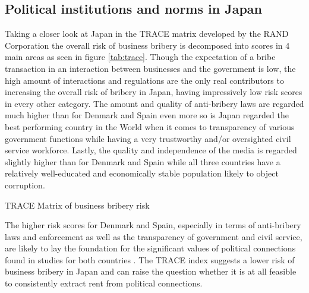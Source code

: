 \subsection{Political institutions and norms in Japan}
Taking a closer look at Japan in the TRACE matrix developed by the RAND Corporation \citep{stanley2014business} the overall risk of business bribery is decomposed into scores in 4 main areas as seen in figure \ref{tab:trace}. Though the expectation of a bribe transaction in an interaction between businesses and the government is low, the high amount of interactions and regulations are the only real contributors to increasing the overall risk of bribery in Japan, having impressively low risk scores in every other category. The amount and quality of anti-bribery laws are regarded much higher than for Denmark and Spain even more so is Japan regarded the best performing country in the World when it comes to transparency of various government functions while having a very trustworthy and/or oversighted civil service workforce. Lastly, the quality and independence of the media is regarded slightly higher than for Denmark and Spain while all three countries have a relatively well-educated and economically stable population likely to object corruption.
\begin{table}[H]
  \centering
  \caption{TRACE Matrix of business bribery risk}
  \footnotesize
    
  \label{tab:trace}
\end{table}\noindent
The higher risk scores for Denmark and Spain, especially in terms of anti-bribery laws and enforcement as well as the transparency of government and civil service, are likely to lay the foundation for the significant values of political connections found in studies for both countries \citep{amore2013value,albalate2017weakening}. The TRACE index suggests a lower risk of business bribery in Japan and can raise the question whether it is at all feasible to consistently extract rent from political connections.

